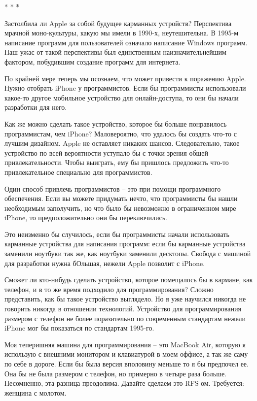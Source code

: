 \documentclass[ebook,12pt,oneside,openany]{memoir}
\begin{document}
* * *

Застолбила ли Apple за собой будущее карманных устройств? Перспектива
мрачной моно-культуры, какую мы имели в 1990-х, неутешительна. В
1995-м написание программ для пользователей означало написание Windows
программ. Наш ужас от такой перспективы был единственным
наизначительнейшим фактором, побудившим создание программ для
интернета.

По крайней мере теперь мы осознаем, что может привести к поражению
Apple. Нужно отобрать iPhone у программистов. Если бы программисты
использовали какое-то другое мобильное устройство для онлайн-доступа,
то они бы начали разработки для него.

Как же можно сделать такое устройство, которое бы больше понравилось
программистам, чем iPhone? Маловероятно, что удалось бы создать что-то
с лучшим дизайном. Apple не оставляет никаких шансов. Следовательно,
такое устройство по всей вероятности уступало бы с точки зрения общей
привлекательности. Чтобы выиграть, ему бы пришлось предложить что-то
привлекательное специально для программистов.

Один способ привлечь программистов – это при помощи программного
обеспечения. Если вы можете придумать нечто, что программисты бы нашли
необходимым заполучить, но что было бы невозможно в ограниченном мире
iPhone, то предположительно они бы переключились.

Это неизменно бы случилось, если бы программисты начали использовать
карманные устройства для написания программ: если бы карманные
устройства заменили ноутбуки так же, как ноутбуки заменили десктопы.
Свобода с машиной для разработки нужна бОльшая, нежели Apple позволит
с iPhone.

Сможет ли кто-нибудь сделать устройство, которое помещалось бы в
кармане, как телефон, и в то же время подходило для программирования?
Сложно представить, как бы такое устройство выглядело. Но я уже
научился никогда не говорить никогда в отношении технологий.
Устройство для программирования размером с телефон не более
поразительно по современным стандартам нежели iPhone мог бы показаться
по стандартам 1995-го.

Моя теперишняя машина для программирования – это MacBook Air, которую
я использую с внешними монитором и клавиатурой в моем оффисе, а так же
саму по себе в дороге. Если бы была версия вполовину меньше то я бы
предпочел ее. Она бы не была размером с телефон, но примерно в четыре
раза больше. Несомненно, эта разница преодолима. Давайте сделаем это
RFS-ом. Требуется: женщина с молотом.
\end{document}
